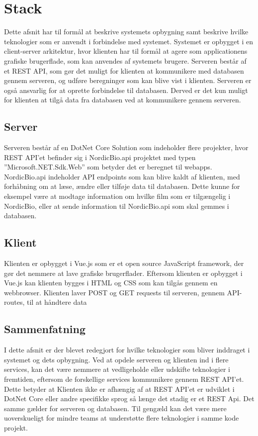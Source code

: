 \section{Stack}
Dette afsnit har til formål at beskrive systemets opbygning samt beskrive hvilke teknologier som er anvendt i forbindelse med systemet. 
Systemet er opbygget i en client-server arkitektur, hvor klienten har til formål at agere som applicationens grafiske 
brugerflade, som kan anvendes af systemets brugere. Serveren består af et REST API, som gør det muligt for klienten 
at kommunikere med databasen gennem serveren, og udføre beregninger som kan blive vist i klienten. Serveren er også 
ansvarlig for at oprette forbindelse til databasen. Derved er det kun muligt for klienten at tilgå data fra databasen 
ved at kommunikere gennem serveren.\\

\subsection{Server}
Serveren består af en DotNet Core Solution som indeholder flere projekter, hvor REST API’et befinder sig i NordicBio.api 
projektet med typen ”Microsoft.NET.Sdk.Web” som betyder det er beregnet til webapps. 
NordicBio.api indeholder API endpoints som kan blive kaldt af klienten, med forhåbning om at læse, ændre eller tilføje data til databasen. 
Dette kunne for eksempel være at modtage information om hvilke film som er tilgængelig i NordicBio, eller at sende information til 
NordicBio.api som skal gemmes i databasen.\\

\subsection{Klient}
Klienten er opbygget i Vue.js som er et open source JavaScript framework, der gør det nemmere at lave grafiske 
brugerflader. Eftersom klienten er opbygget i Vue.js kan klienten bygges i HTML og CSS som kan tilgås 
gennem en webbrowser. Klienten laver POST og GET requests til serveren, gennem API-routes, til at håndtere data\\

\subsection{Sammenfatning}
I dette afsnit er der blevet redegjort for hvilke teknologier som bliver inddraget i systemet og dets opbygning. 
Ved at opdele serveren og klienten ind i flere services, kan det være nemmere at vedligeholde eller udskifte teknologier 
i fremtiden, eftersom de forskellige services kommunikere gennem REST API’et. 
Dette betyder at Klienten ikke er afhængig af at REST API’et er udviklet i DotNet Core eller andre specifikke sprog så 
længe det stadig er et REST Api. Det samme gælder for serveren og databasen. Til gengæld kan det være mere uoverskueligt 
for mindre teams at understøtte flere teknologier i samme kode projekt. 


